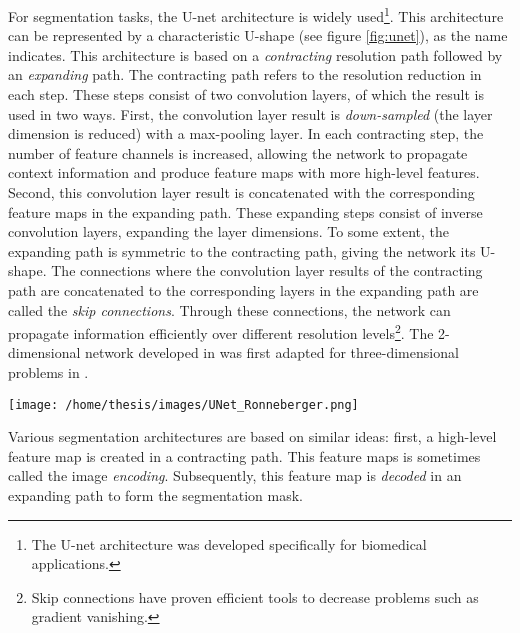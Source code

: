 \par{
    For segmentation tasks, the U-net architecture\cite{Ronneberger2015} is widely used\footnote{The U-net architecture was developed specifically for biomedical applications.}. 
    This architecture can be represented by a characteristic U-shape (see figure \ref{fig:unet}), as the name indicates.
    This architecture is based on a \textit{contracting} resolution path followed by an \textit{expanding} path. 
    The contracting path refers to the resolution reduction in each step. 
    These steps consist of two convolution layers, of which the result is used in two ways. 
    First, the convolution layer result is \textit{down-sampled} (the layer dimension is reduced) with a max-pooling layer.
    In each contracting step, the number of feature channels is increased, allowing the network to propagate context information and produce feature maps with more high-level features.
    Second, this convolution layer result is concatenated with the corresponding feature maps in the expanding path.
    These expanding steps consist of inverse convolution layers, expanding the layer dimensions. To some extent, the expanding path is symmetric to the contracting path, giving the network its U-shape. 
    The connections where the convolution layer results of the contracting path are concatenated to the corresponding layers in the expanding path are called the \textit{skip connections}.
    Through these connections, the network can propagate information efficiently over different resolution levels\footnote{Skip connections have proven efficient tools to decrease problems such as gradient vanishing.}.
    The 2-dimensional network developed in \cite{Ronneberger2015} was first adapted for three-dimensional problems in \cite{Cicek2016}.
}
\begin{SCfigure}[][htb]
    \texttt{[image: /home/thesis/images/UNet\_Ronneberger.png]}
    \caption{U-Net architecture, as illustrated in \cite{Ronneberger2015}. 
    Each blue box represents a multi-channel feature-map. 
    The number of channels is indicated above the box, the $x \times y$ dimensions are indicated at the bottom left.
    The gray arrows indicate the feature maps in the contracting path are copied and concatenated to the feature maps of the expanding path.}
    \label{fig:unet}
\end{SCfigure}
\par{
    Various segmentation architectures are based on similar ideas: first, a high-level feature map is created in a contracting path. 
    This feature maps is sometimes called the image \textit{encoding}. 
    Subsequently, this feature map is \textit{decoded} in an expanding path to form the segmentation mask. 
}


